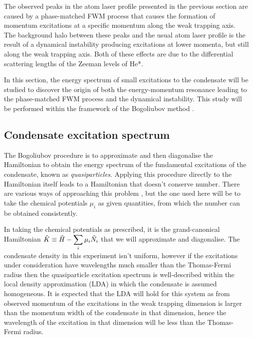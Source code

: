 The observed peaks in the atom laser profile presented in the previous section are caused by a phase-matched FWM process that causes the formation of momentum excitations at a specific momentum along the weak trapping axis. The background halo between these peaks and the usual atom laser profile is the result of a dynamical instability producing excitations at lower momenta, but still along the weak trapping axis. Both of these effects are due to the differential scattering lengths of the Zeeman levels of He*.

In this section, the energy spectrum of small excitations to the condensate will be studied to discover the origin of both the energy-momentum resonance leading to the phase-matched FWM process and the dynamical instability. This study will be performed within the framework of the Bogoliubov method \citep{Bogoliubov:1947,FetterWalecka}.

\subsection{Condensate excitation spectrum}
The Bogoliubov procedure \citep{Bogoliubov:1947} is to approximate and then diagonalise the Hamiltonian to obtain the energy spectrum of the fundamental excitations of the condensate, known as \emph{quasiparticles}.  Applying this procedure directly to the Hamiltonian itself leads to a Hamiltonian that doesn't conserve number. There are various ways of approaching this problem \citep{FetterWalecka}, but the one used here will be to take the chemical potentials $\mu_i$ as given quantities, from which the number can be obtained consistently.

In taking the chemical potentials as prescribed, it is the grand-canonical Hamiltonian $\displaystyle\protect{\hat{K} \equiv \hat{H} - \sum_i \mu_i \hat{N}_i}$ that we will approximate and diagonalise.  The condensate density in this experiment isn't uniform, however if the excitations under consideration have wavelengths much smaller than the Thomas-Fermi radius then the quasiparticle excitation spectrum is well-described within the local density approximation (LDA) \citep{Stamper-Kurn:1999,Zambelli:2000} in which the condensate is assumed homogeneous.  It is expected that the LDA will hold for this system as from observed momentum of the excitations in the weak trapping dimension is larger than the momentum width of the condensate in that dimension, hence the wavelength of the excitation in that dimension will be less than the Thomas-Fermi radius.


